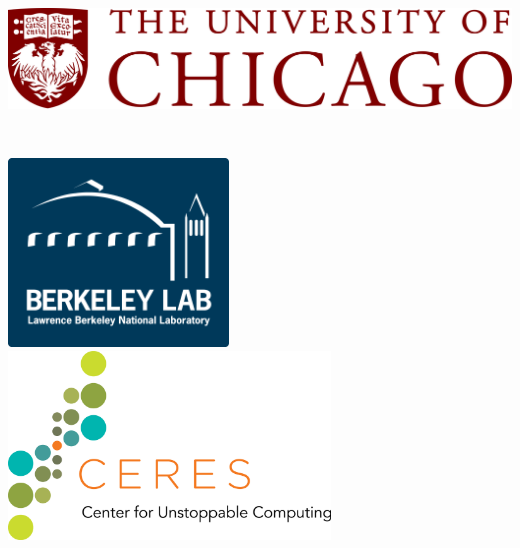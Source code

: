 \documentclass[a0,portrait]{a0poster}
\begin{document}

\begin{minipage}[b]{\linewidth}
\begin{center}
\includegraphics[height=5cm]{figures/uchicago_logo.png} %
\hspace{18cm}
\includegraphics[height=5cm]{figures/lbnl_logo.png}
\hspace{18cm}
\includegraphics[height=5cm]{figures/ceres-logo.png}\\
\vspace{0.25cm}
\noindent\makebox[\linewidth]{\rule{0.9\paperwidth}{0.4pt}}
\vspace{0.25cm}
\end{center}


\end{minipage}
\end{document}
